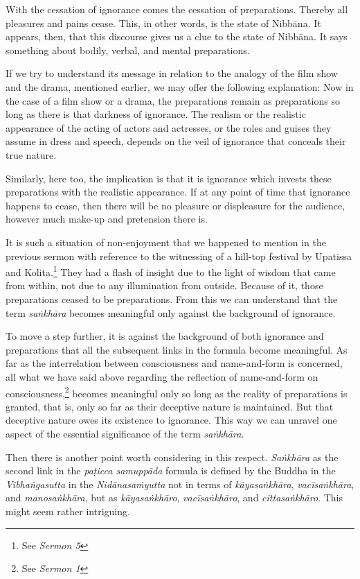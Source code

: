 With the cessation of ignorance comes the cessation of preparations. Thereby all pleasures and pains cease. This, in other words, is the state of Nibbāna. It appears, then, that this discourse gives us a clue to the state of Nibbāna. It says something about bodily, verbal, and mental preparations.

If we try to understand its message in relation to the analogy of the film show and the drama, mentioned earlier, we may offer the following explanation: Now in the case of a film show or a drama, the preparations remain as preparations so long as there is that darkness of ignorance. The realism or the realistic appearance of the acting of actors and actresses, or the roles and guises they assume in dress and speech, depends on the veil of ignorance that conceals their true nature.

Similarly, here too, the implication is that it is ignorance which invests these preparations with the realistic appearance. If at any point of time that ignorance happens to cease, then there will be no pleasure or displeasure for the audience, however much make-up and pretension there is.

It is such a situation of non-enjoyment that we happened to mention in the previous sermon with reference to the witnessing of a hill-top festival by Upatissa and Kolita.\footnote{See \emph{Sermon 5}} They had a flash of insight due to the light of wisdom that came from within, not due to any illumination from outside. Because of it, those preparations ceased to be preparations. From this we can understand that the term \emph{saṅkhāra} becomes meaningful only against the background of ignorance.

To move a step further, it is against the background of both ignorance and preparations that all the subsequent links in the formula become meaningful. As far as the interrelation between consciousness and name-and-form is concerned, all what we have said above regarding the reflection of name-and-form on consciousness,\footnote{See \emph{Sermon 1}} becomes meaningful only so long as the reality of preparations is granted, that is, only so far as their deceptive nature is maintained. But that deceptive nature owes its existence to ignorance. This way we can unravel one aspect of the essential significance of the term \emph{saṅkhāra}.

Then there is another point worth considering in this respect. \emph{Saṅkhāra} as the second link in the \emph{paṭicca samuppāda} formula is defined by the Buddha in the \emph{Vibhaṅgasutta} in the \emph{Nidānasaṁyutta} not in terms of \emph{kāyasaṅkhāra}, \emph{vacīsaṅkhāra}, and \emph{manosaṅkhāra}, but as \emph{kāyasaṅkhāro}, \emph{vacīsaṅkhāro}, and \emph{cittasaṅkhāro}. This might seem rather intriguing.

